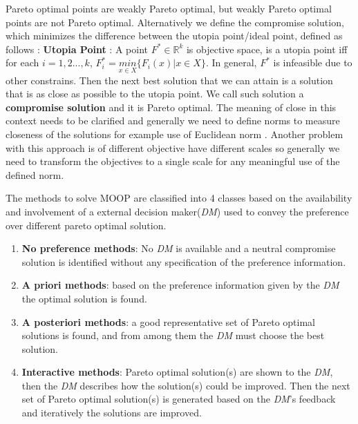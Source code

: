 Pareto optimal points are weakly Pareto optimal, but weakly Pareto optimal points are not Pareto optimal.\newline
Alternatively we define the compromise solution, which minimizes the difference between the utopia point/ideal point, defined as follows \cite{vincent1981optimality}:\newline\newline
\textbf{Utopia Point} \label{ideal_point_def}: A point $F^{*} \in \mathbb{R}^k$ is objective space, is a utopia point iff for each $i = 1, 2 ... ,k$, $F^{*}_i = \underset{x \in X}{min} \{ F_i(x)|x \in X\}$.\newline\newline
In general, $F^{*}$ is infeasible due to other constrains. Then the next best solution that we can attain is a solution that is as close as possible to the utopia point. We call such solution a \textbf{compromise solution} and it is Pareto optimal. The meaning of close in this context needs to be clarified and generally we need to define norms to measure closeness of the solutions for example use of Euclidean norm \cite{vincent1983game}. Another problem with this approach is of different objective have different scales so generally we need to transform the objectives to a single scale for any meaningful use of the defined norm.

The methods to solve MOOP are classified into 4 classes \cite{hwang2012multiple} based on the availability and involvement of a external decision maker(\textit{DM}) used to convey the preference over different pareto optimal solution.
\begin{enumerate}
    \item \textbf{No preference methods}: No \textit{DM} is available and a neutral compromise solution is identified without any specification of the preference information.
    \item \textbf{A priori methods}: based on the preference information given by the \textit{DM} the optimal solution is found.
    \item \textbf{A posteriori methods}: a good representative set of Pareto optimal solutions is found, and from among them the \textit{DM} must choose the best solution.
    \item \textbf{Interactive methods}: Pareto optimal solution(s) are shown to the \textit{DM}, then the \textit{DM} describes how the solution(s) could be improved. Then the next set of Pareto optimal solution(s) is generated based on the \textit{DM}'s feedback and iteratively the solutions are improved.
\end{enumerate}

